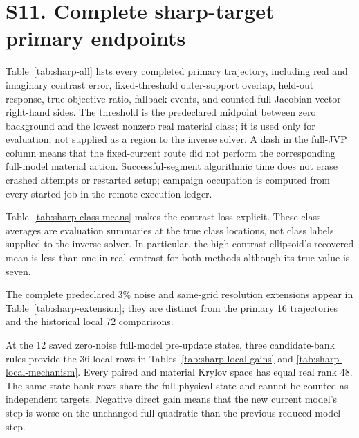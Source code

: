 \documentclass[11pt]{article}
\begin{document}
\section*{S11. Complete sharp-target primary endpoints}

Table~\ref{tab:sharp-all} lists every completed primary trajectory, including real and imaginary contrast error, fixed-threshold outer-support overlap, held-out response, true objective ratio, fallback events, and counted full Jacobian-vector right-hand sides. The threshold is the predeclared midpoint between zero background and the lowest nonzero real material class; it is used only for evaluation, not supplied as a region to the inverse solver. A dash in the full-JVP column means that the fixed-current route did not perform the corresponding full-model material action. Successful-segment algorithmic time does not erase crashed attempts or restarted setup; campaign occupation is computed from every started job in the remote execution ledger.



Table~\ref{tab:sharp-class-means} makes the contrast loss explicit. These class averages are evaluation summaries at the true class locations, not class labels supplied to the inverse solver. In particular, the high-contrast ellipsoid's recovered mean is less than one in real contrast for both methods although its true value is seven.



The complete predeclared 3\% noise and same-grid resolution extensions appear in Table~\ref{tab:sharp-extension}; they are distinct from the primary 16 trajectories and the historical local 72 comparisons.



At the 12 saved zero-noise full-model pre-update states, three candidate-bank rules provide the 36 local rows in Tables~\ref{tab:sharp-local-gains} and \ref{tab:sharp-local-mechanism}. Every paired and material Krylov space has equal real rank 48. The same-state bank rows share the full physical state and cannot be counted as independent targets. Negative direct gain means that the new current model's step is worse on the unchanged full quadratic than the previous reduced-model step.


\end{document}
